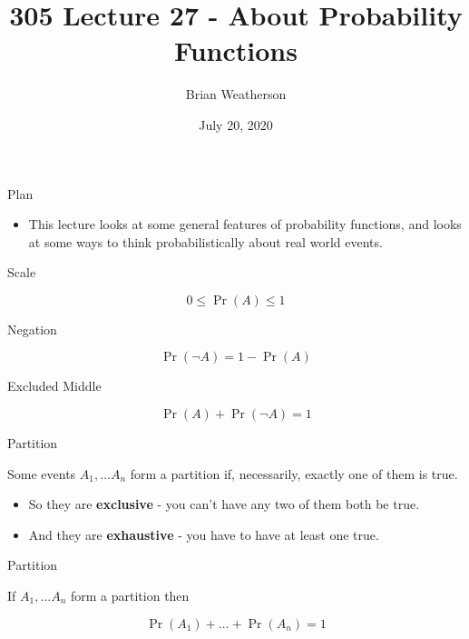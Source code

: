 \documentclass[
  ignorenonframetext,
]{beamer}
\title{305 Lecture 27 - About Probability Functions}
\author{Brian Weatherson}
\date{July 20, 2020}
\providecommand{\tightlist}{%
  \setlength{\itemsep}{0pt}\setlength{\parskip}{0pt}}
\renewcommand{\,}{\text{, }}
\begin{document}
\frame{\titlepage}

\begin{frame}{Plan}
\protect\hypertarget{plan}{}

\begin{itemize}
\tightlist
\item
  This lecture looks at some general features of probability functions,
  and looks at some ways to think probabilistically about real world
  events.
\end{itemize}

\end{frame}

\begin{frame}{Scale}
\protect\hypertarget{scale}{}

\[
0 \leq \Pr(A) \leq 1
\]

\end{frame}

\begin{frame}{Negation}
\protect\hypertarget{negation}{}

\[
\Pr(\neg A) = 1 - \Pr(A)
\]

\end{frame}

\begin{frame}{Excluded Middle}
\protect\hypertarget{excluded-middle}{}

\[
\Pr(A) + \Pr(\neg A) = 1
\]

\end{frame}

\begin{frame}{Partition}
\protect\hypertarget{partition}{}

Some events \(A_1, \dots A_n\) form a partition if, necessarily, exactly
one of them is true.

\begin{itemize}
\tightlist
\item
  So they are \textbf{exclusive} - you can't have any two of them both
  be true.
\item
  And they are \textbf{exhaustive} - you have to have at least one true.
\end{itemize}

\end{frame}

\begin{frame}{Partition}
\protect\hypertarget{partition-1}{}

If \(A_1, \dots A_n\) form a partition then

\[
\Pr(A_1) + \dots + \Pr(A_n) = 1
\]

\end{frame}
\end{document}
